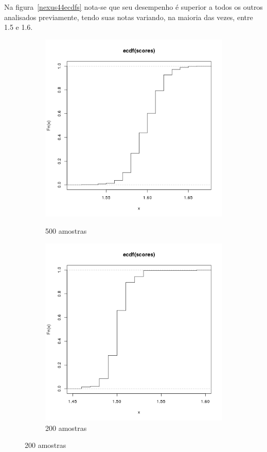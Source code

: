 \documentclass[11pt,a4paper]{article}
\begin{document}
Na figura~\ref{nexus44ecdfs} nota-se que seu desempenho é superior a todos os outros analisados previamente, tendo suas
notas variando, na maioria das vezes, entre 1.5 e 1.6.

\begin{figure}[H]
    \caption{ECDFs - Nexus 7, Android 4.4 Chrome}
    \label{nexus44ecdfs}
    \begin{subfigure}{.5\textwidth}
        \caption{500 amostras}
        \centering
        \includegraphics[width=\textwidth]{images/ecdf-n7-a44-chrome-500-amostras-20131119}
        \label{nexus44500}
    \end{subfigure}
    \begin{subfigure}{.5\textwidth}
        \caption{200 amostras}
        \centering
        \includegraphics[width=\textwidth]{images/ecdf-n7-a44-chrome-200-amostras-20131120}

\end{subfigure}
\end{figure}
\end{document}
